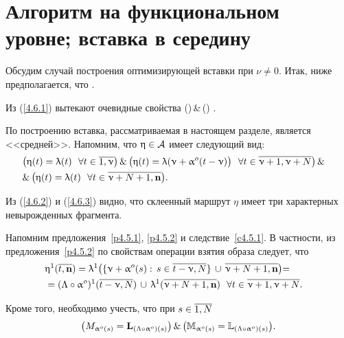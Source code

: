 
\section{
  Алгоритм на функциональном уровне;
  вставка в середину
}
\label{sect:4.6}
\setcounter{equation}{0}

Обсудим случай построения оптимизирующей вставки при
$\nu \neq 0$.
Итак, ниже предполагается, что
\bfn
  \label{4.6.1}
  \nu\in {}
  .
\efn

Из (\ref{4.6.1}) вытекают очевидные свойства
\bfn
  \label{4.6.2}
  (\neq \emp)\,\&\,(\neq \emp)
  .
\efn

По построению вставка, рассматриваемая в настоящем разделе, является <<средней>>.
Напомним, что $\upeta\in {\cal A}$ имеет следующий вид:
\begin{eqnarray}
  &\bigl(\eta(t) = \la(t)\ \ \fa t\in \ov{1,\nu}\bigl)\,\&\,\bigl(\eta(t) =
  \la(\nu+ \al^o(t-\nu)\bigl)\ \ \fa t\in \ov{\nu+1,\nu+N}\bigl)\,\&
  &\nonumber\\
  &\&\,\bigl(\eta(t)= \la(t)\ \ \fa t\in \ov{\nu+N+1,\mathbf{n}}\bigl)
  .
  &
  \label{4.6.3}
\end{eqnarray}

Из (\ref{4.6.2}) и (\ref{4.6.3}) видно,
что склеенный маршрут $\eta$
имеет три характерных невырожденных фрагмента.

Напомним предложения~\ref{p4.5.1}, \ref{p4.5.2} и следствие~\ref{c4.5.1}.
В частности,
из предложения~\ref{p4.5.2}
по свойствам операции взятия образа следует, что
\begin{eqnarray}
  &\eta^1(\ov{t,\mathbf{n}}) = \la^1\bigl(\{\nu+\al^o(s):\,s\in \ov{t-\nu,N}\}\,\cup\,
  \ov{\nu+N+1,\nn}\bigl) =
  &\nonumber\\
  &= (\La \circ\al^o)^1(\ov{t-\nu,N})\,\cup\, \la^1(\ov{\nu+N+1,\nn})\ \ \fa t\in \ov{\nu+1,\nu+N}
  .
  &
  \label{4.6.3`}
\end{eqnarray}

Кроме того,
необходимо учесть,
что при
$s\in \ov{1,N}$
$$
  \bigl(M_{\upalpha^o(s)} = \mathbf{L}_{(\Lambda\circ \upalpha^o)(s)}\bigl)\,\&\,\bigl({\mathbb M}_{\upalpha^o(s)} =
  {\mathbb L}_{(\Lambda\circ \upalpha^o)(s)}\bigl)
  .
$$

